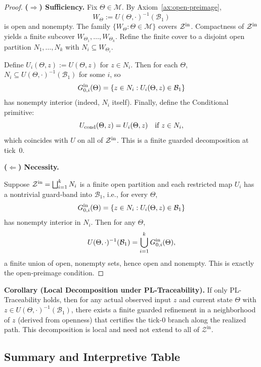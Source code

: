 \documentclass[12pt]{article}
\theoremstyle{definition}
\theoremstyle{plain}
\begin{document}
\begin{proof}
\textbf{(\(\Rightarrow\)) Sufficiency.}  
Fix $\Theta\in\mathcal M$.  By Axiom~\ref{ax:open-preimage}, 
\[
  W_\Theta:=U(\Theta,\cdot)^{-1}(\mathcal B_1)
\]
is open and nonempty.  The family $\{W_\Theta:\Theta\in\mathcal M\}$ covers $\mathcal Z^{\rm in}$.  Compactness of $\mathcal Z^{\rm in}$ yields a finite subcover $W_{\Theta_1},\dots,W_{\Theta_k}$.  Refine the finite cover to a disjoint open partition $N_1,\dots,N_k$ with $N_i\subseteq W_{\Theta_i}$.

Define $U_i(\Theta,z):=U(\Theta,z)$ for $z\in N_i$.  Then for each $\Theta$, $N_i\subseteq U(\Theta,\cdot)^{-1}(\mathcal B_1)$ for some $i$, so 
\[
  G^{\rm in}_{0,i}(\Theta)=\{z\in N_i: U_i(\Theta,z)\in\mathcal B_1\}
\]
has nonempty interior (indeed, $N_i$ itself).  Finally, define the Conditional primitive:
\[
  U_{\rm cond}(\Theta,z)
  = U_i(\Theta,z)\quad\text{if }z\in N_i,
\]
which coincides with $U$ on all of $\mathcal Z^{\rm in}$.  This is a finite guarded decomposition at tick 0.

\medskip\noindent
\textbf{(\(\Leftarrow\)) Necessity.}  

Suppose  
$\mathcal Z^{\rm in}=\bigsqcup_{i=1}^k N_i$ is a finite open partition and each restricted map $U_i$ has a nontrivial guard‑band into $\mathcal B_1$, i.e., for every $\Theta$, 
\[
  G^{\rm in}_{0,i}(\Theta)=\{z\in N_i:U_i(\Theta,z)\in\mathcal B_1\}
\]
has nonempty interior in $N_i$. Then for any $\Theta$,
\[
  U(\Theta,\cdot)^{-1}(\mathcal B_1)
  = \bigcup_{i=1}^k G^{\rm in}_{0,i}(\Theta),
\]
a finite union of open, nonempty sets, hence open and nonempty.  This is exactly the open‑preimage condition.
\end{proof}

\textbf{Corollary (Local Decomposition under PL-Traceability).}  
If only PL-Traceability holds, then for any actual observed input \(z\) and current state \(\Theta\) with \(z\in U(\Theta,\cdot)^{-1}(\mathcal B_1)\), there exists a finite guarded refinement in a neighborhood of \(z\) (derived from openness) that certifies the tick-0 branch along the realized path. This decomposition is local and need not extend to all of \(\mathcal Z^{\mathrm{in}}\).


\subsection{Summary and Interpretive Table}
\label{subsec:summary-table}
\end{document}
